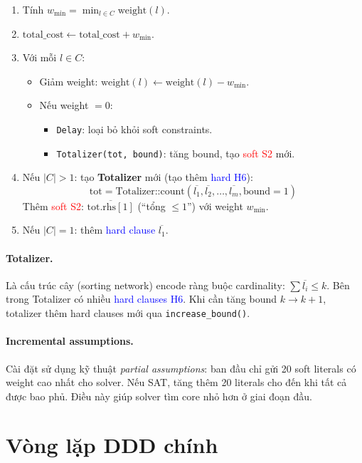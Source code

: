\documentclass[11pt,a4paper]{article}
\begin{document}
\begin{enumerate}
  \item Tính $w_{\min} = \min_{l \in C} \text{weight}(l)$.
  \item $\text{total\_cost} \gets \text{total\_cost} + w_{\min}$.
  \item Với mỗi $l \in C$:
    \begin{itemize}
      \item Giảm weight: $\text{weight}(l) \gets \text{weight}(l) - w_{\min}$.
      \item Nếu weight $= 0$:
        \begin{itemize}
          \item \texttt{Delay}: loại bỏ khỏi soft constraints.
          \item \texttt{Totalizer(tot, bound)}: tăng bound, tạo \textcolor{red}{soft S2} mới.
        \end{itemize}
    \end{itemize}
  \item Nếu $|C| > 1$: tạo \textbf{Totalizer} mới (tạo thêm \textcolor{blue}{hard H6}):
    \[
    \text{tot} = \text{Totalizer::count}(\overline{l_1}, \overline{l_2}, \ldots, \overline{l_m}, \text{bound}=1)
    \]
    Thêm \textcolor{red}{soft S2}: $\overline{\text{tot.rhs}[1]}$ (``tổng $\leq 1$'') với weight $w_{\min}$.
  \item Nếu $|C| = 1$: thêm \textcolor{blue}{hard clause} $\overline{l_1}$.
\end{enumerate}

\paragraph{Totalizer.} Là cấu trúc cây (sorting network) encode ràng buộc cardinality: $\sum \overline{l_i} \leq k$. Bên trong Totalizer có nhiều \textcolor{blue}{hard clauses H6}. Khi cần tăng bound $k \to k+1$, totalizer thêm hard clauses mới qua \texttt{increase\_bound()}.

\paragraph{Incremental assumptions.} Cài đặt sử dụng kỹ thuật \emph{partial assumptions}: ban đầu chỉ gửi 20 soft literals có weight cao nhất cho solver. Nếu SAT, tăng thêm 20 literals cho đến khi tất cả được bao phủ. Điều này giúp solver tìm core nhỏ hơn ở giai đoạn đầu.


\section{Vòng lặp DDD chính}
\label{sec:ddd-loop}
\end{document}
